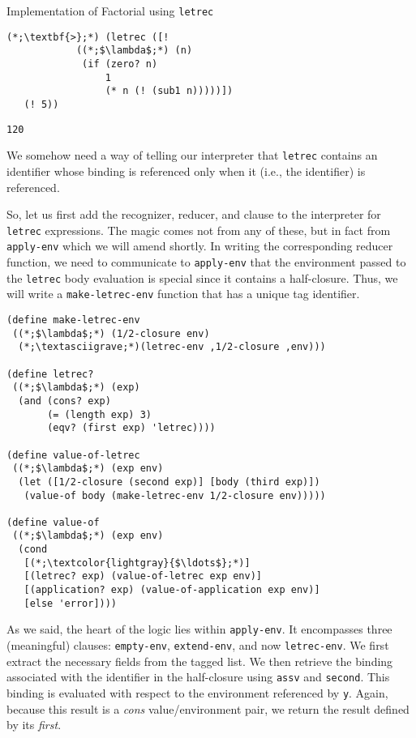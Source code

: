 \begin{clo}[]{Implementation of Factorial using \texttt{letrec}}
\begin{lstlisting}[language=MyNLNSOutput]
(*;\textbf{>};*) (letrec ([! 
            ((*;$\lambda$;*) (n)
             (if (zero? n) 
                 1 
                 (* n (! (sub1 n)))))])
   (! 5))
\end{lstlisting}
\tcblower
\begin{lstlisting}[language=MyOutput]
120
\end{lstlisting}
\end{clo}

We somehow need a way of telling our interpreter that \texttt{letrec} contains an identifier whose binding is referenced only when it (i.e., the identifier) is referenced. 

So, let us first add the recognizer, reducer, and clause to the interpreter for \texttt{letrec} expressions. The magic comes not from any of these, but in fact from \texttt{apply-env} which we will amend shortly. In writing the corresponding reducer function, we need to communicate to \texttt{apply-env} that the environment passed to the \texttt{letrec} body evaluation is special since it contains a half-closure. Thus, we will write a \texttt{make-letrec-env} function that has a unique tag identifier. 

\begin{cl}[]{}
\begin{lstlisting}[language=MyScheme]
(define make-letrec-env
 ((*;$\lambda$;*) (1/2-closure env)
  (*;\textasciigrave;*)(letrec-env ,1/2-closure ,env)))

(define letrec?
 ((*;$\lambda$;*) (exp)
  (and (cons? exp)
       (= (length exp) 3)
       (eqv? (first exp) 'letrec))))
        
(define value-of-letrec
 ((*;$\lambda$;*) (exp env)
  (let ([1/2-closure (second exp)] [body (third exp)])
   (value-of body (make-letrec-env 1/2-closure env)))))

(define value-of
 ((*;$\lambda$;*) (exp env)
  (cond
   [(*;\textcolor{lightgray}{$\ldots$};*)]
   [(letrec? exp) (value-of-letrec exp env)]
   [(application? exp) (value-of-application exp env)]
   [else 'error])))
\end{lstlisting}
\end{cl}

As we said, the heart of the logic lies within \texttt{apply-env}. It encompasses three (meaningful) clauses: \texttt{empty-env}, \texttt{extend-env}, and now \texttt{letrec-env}. We first extract the necessary fields from the tagged list. We then retrieve the binding associated with the identifier in the half-closure using \texttt{assv} and \texttt{second}. This binding is evaluated with respect to the environment referenced by \texttt{y}. Again, because this result is a \textit{cons} value/environment pair, we return the result defined by its \textit{first}.

